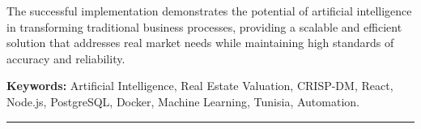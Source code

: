 The successful implementation demonstrates the potential of artificial intelligence in transforming traditional business processes, providing a scalable and efficient solution that addresses real market needs while maintaining high standards of accuracy and reliability.

\vspace{0.8cm}

\textbf{Keywords:} Artificial Intelligence, Real Estate Valuation, CRISP-DM, React, Node.js, PostgreSQL, Docker, Machine Learning, Tunisia, Automation.

\vspace{1cm}

\noindent\rule{\textwidth}{0.4pt}
